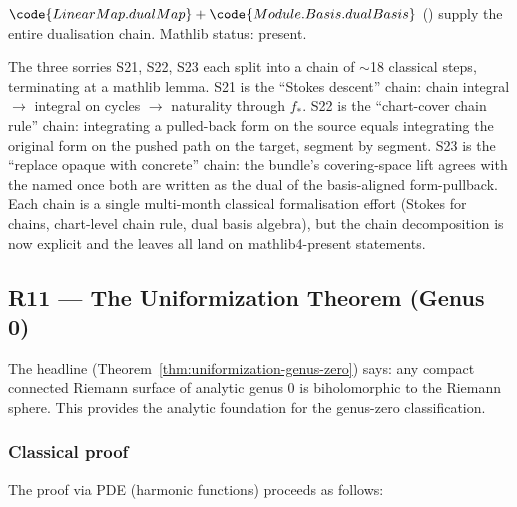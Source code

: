 \begin{lemma}
\label{lem:pdp-r17}
$\code{LinearMap.dualMap}+\code{Module.Basis.dualBasis}$
() supply the entire dualisation
chain.  Mathlib status: present.
\leanok\mathlibok
\end{lemma}

\begin{layman}
The three sorries S21, S22, S23 each split into a chain of $\sim$18
classical steps, terminating at a mathlib lemma.  S21 is the ``Stokes
descent'' chain: chain integral $\to$ integral on cycles $\to$
naturality through $f_{*}$.  S22 is the ``chart-cover chain rule''
chain: integrating a pulled-back form on the source equals integrating
the original form on the pushed path on the target, segment by segment.
S23 is the ``replace opaque with concrete'' chain: the bundle's
covering-space lift agrees with the named 
once both are written as the dual of the basis-aligned form-pullback.
Each chain is a single multi-month classical formalisation effort
(Stokes for chains, chart-level chain rule, dual basis algebra), but
the chain decomposition is now explicit and the leaves all land on
mathlib4-present statements.
\end{layman}

\subsection{R11 --- The Uniformization Theorem (Genus 0)}
\label{subsec:gap-R11-uniformization}

The headline (Theorem~\ref{thm:uniformization-genus-zero}) says: any compact connected Riemann surface of analytic genus 0 is biholomorphic to the Riemann sphere. This provides the analytic foundation for the genus-zero classification.

\subsubsection*{Classical proof}

The proof via PDE (harmonic functions) proceeds as follows:

